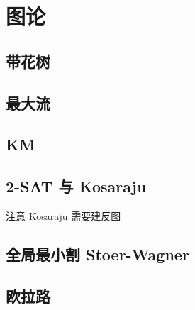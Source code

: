 \documentclass[landscape, twocolumn, 8pt, a4paper, twoside]{extarticle}
\begin{document}
\section{图论}
  \subsection{带花树}
    

  \subsection{最大流}
    
  
%    
  
  \subsection{KM}
    

  \subsection{2-SAT 与 Kosaraju}
    注意 Kosaraju 需要建反图
    

  \subsection{全局最小割 Stoer-Wagner}
    

%    

  \subsection{欧拉路}
    

%    
\end{document}
